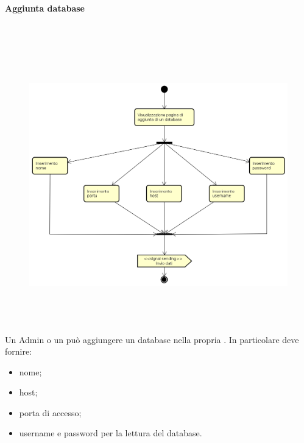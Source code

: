\paragraph{Aggiunta database} \mbox{} \\
\begin{figure}[H]
\begin{center}
\includegraphics[height=12cm]{res/sections/backend/activities/aggiuntaDatabase.png}
\end{center}
\end{figure}
Un Admin o un  può aggiungere un database nella propria . In particolare deve fornire:
\begin{itemize}
\item nome;
\item host;
\item porta di accesso;
\item username e password per la lettura del database.
\end{itemize}
